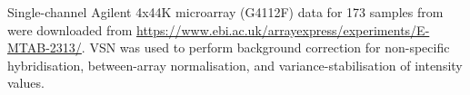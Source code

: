 
Single-channel Agilent 4x44K microarray (G4112F) data for 173 samples from \autocite{sobolev2016AdjuvantedInfluenzaH1N1Vaccination} were downloaded from \url{https://www.ebi.ac.uk/arrayexpress/experiments/E-MTAB-2313/}.
VSN\autocite{huber2002VarianceStabilizationApplied} was used to perform background correction for non-specific hybridisation, between-array normalisation, and variance-stabilisation of intensity values.

